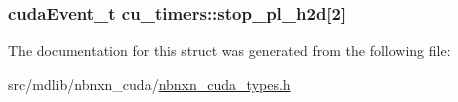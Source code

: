 \hypertarget{structcu__timers_a4b0ba4ce55b4d959556a621bbc24d606}{
\subsubsection[{stop\-\_\-pl\-\_\-h2d}]{\setlength{\rightskip}{0pt plus 5cm}cuda\-Event\-\_\-t {\bf cu\-\_\-timers\-::stop\-\_\-pl\-\_\-h2d}\mbox{[}2\mbox{]}}}\label{structcu__timers_a4b0ba4ce55b4d959556a621bbc24d606}


\-The documentation for this struct was generated from the following file\-:\begin{DoxyCompactItemize}
\item 
src/mdlib/nbnxn\-\_\-cuda/\hyperlink{nbnxn__cuda__types_8h}{nbnxn\-\_\-cuda\-\_\-types.\-h}\end{DoxyCompactItemize}
